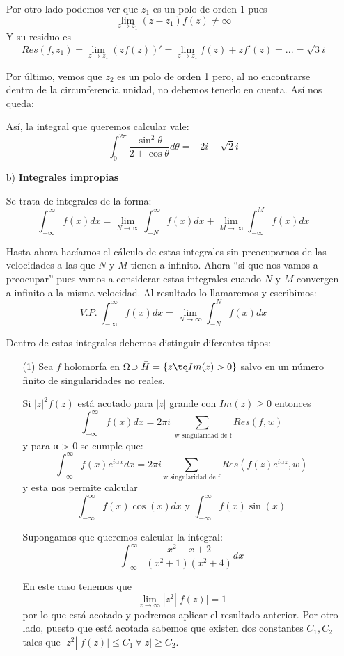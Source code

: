 \documentclass{apuntes}
\begin{document}
\begin{enumerate}
\begin{example}
Por otro lado podemos ver que $z_1$ es un polo de orden 1 pues
\[\lim_{z \to z_1} (z-z_1)f(z) \neq \infty\]
Y su residuo es
\[Res(f,z_1) = \lim_{z \to z_1}\left(zf(z)\right)' = \lim_{z \to z_1} f(z) + zf'(z) = ... = \sqrt{3}i\]

Por último, vemos que $z_2$ es un polo de orden 1 pero, al no encontrarse dentro de la circunferencia unidad, no debemos tenerlo en cuenta. Así nos queda:

Así, la integral que queremos calcular vale:
\[\int_0^{2π} \frac{\sin^2 \theta}{2+\cos \theta}d\theta = -2i + \sqrt{2}i\]
\end{example}

\item[b)] \textbf{Integrales impropias}

Se trata de integrales de la forma:
\[\int_{-\infty}^{\infty} f(x)dx = \lim_{N \to \infty}\int_{-N}^{\infty}f(x)dx + \lim_{M \to \infty} \int_{-\infty}^{M} f(x)dx\]

Hasta ahora hacíamos el cálculo de estas integrales sin preocuparnos de las velocidades a las que $N$ y $M$ tienen a infinito. Ahora ``si que nos vamos a preocupar'' pues vamos a considerar estas integrales cuando $N$ y $M$ convergen a infinito a la misma velocidad. Al resultado lo llamaremos  y escribimos:
\[V.P. \ \int_{-\infty}^{\infty} f(x)dx = \lim_{N \to \infty}\int_{-N}^N f(x)dx\]

Dentro de estas integrales debemos distinguir diferentes tipos:
\begin{enumerate}
\item[(1)] Sea $f$ holomorfa en Ω$\supset \bar{H}=\{z \tq Im(z)>0\}$ salvo en un número finito de singularidades no reales.

Si $|z|^2f(z)$ está acotado para $|z|$ grande con $Im(z)\geq 0$ entonces
\[\int_{-\infty}^{\infty}f(x)dx = 2πi \sum_{\text{ w singularidad de f}}Res(f,w)\]
y para α > 0 se cumple que:
\[\int_{-\infty}^{\infty} f(x)e^{iαx}dx = 2πi \sum_{\text{w singularidad de f}}Res(f(z)e^{iαz},w)\]
y esta nos permite calcular
\[\int_{-\infty}^{\infty} f(x)\cos(x)dx \text{ y } \int_{-\infty}^{\infty}f(x)\sin(x)\]

\begin{example}
Supongamos que queremos calcular la integral:
\[\int_{-\infty}^{\infty} \frac{x^2-x+2}{(x^2+1)(x^2+4)}dx\]

En este caso tenemos que
\[\lim_{z \to \infty} |z^2||f(z)|=1\]
por lo que está acotado y podremos aplicar el resultado anterior. Por otro lado, puesto que está acotada sabemos que existen dos constantes $C_1, C_2$ tales que $|z^2||f(z)|\leq C_1 \ \forall |z|  \geq C_2$.


\end{example}
\end{enumerate}
\end{enumerate}
\end{document}
